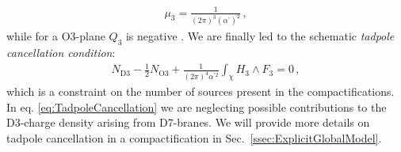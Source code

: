\documentclass[12pt,a4paper]{book}
\begin{document}
\begin{align}
\label{eq:DpTension}
\mu_3 = \frac{1}{(2 \pi)^3 \left(\alpha^{'}\right)^2}\,,
\end{align}
while for a O3-plane $Q_3$ is negative \cite{Giddings:2001yu}. We are finally led to the schematic \textit{tadpole cancellation condition}:
\begin{align}
\label{eq:TadpoleCancellation}
N_{\text{D3}} - \frac{1}{2} N_{\text{O3}} + \frac{1}{\left(2 \pi\right)^4 \alpha^{'2}} \int_{\chi} H_3 \wedge F_3 = 0\,,
\end{align}
which is a constraint on the number of sources present in the compactifications. In eq. \eqref{eq:TadpoleCancellation} we are neglecting possible contributions to the D3-charge density arising from D7-branes. We will provide more details on tadpole cancellation in a compactification in Sec.~\ref{ssec:ExplicitGlobalModel}.\\
\end{document}
